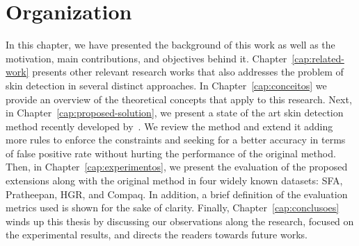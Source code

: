 \section{Organization}
\label{sec:text_organization}
In this chapter, we have presented the background of this work as well as the motivation, main contributions, and objectives behind it. Chapter~\ref{cap:related-work} presents other relevant research works that also addresses the problem of skin detection in several distinct approaches. In Chapter~\ref{cap:conceitos} we provide an overview of the theoretical concepts that apply to this research. Next, in Chapter~\ref{cap:proposed-solution}, we present a state of the art skin detection method recently developed by~\citet{brancati:17}. We review the method and extend it adding more rules to enforce the constraints and seeking for a better accuracy in terms of false positive rate without hurting the performance of the original method. Then, in Chapter~\ref{cap:experimentos}, we present the evaluation of the proposed extensions along with the original method in four widely known datasets: SFA, Pratheepan, HGR, and Compaq. In addition, a brief definition of the evaluation metrics used is shown for the sake of clarity. Finally, Chapter~\ref{cap:conclusoes} winds up this thesis by discussing our observations along the research, focused on the experimental results, and directs the readers towards future works.